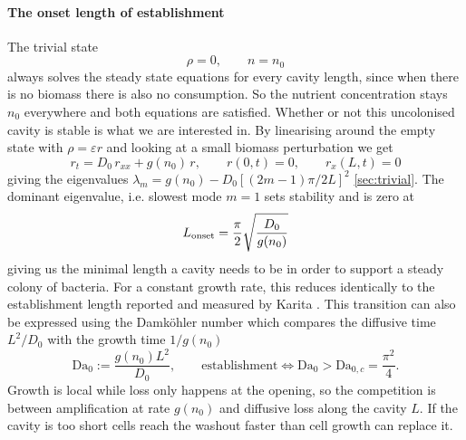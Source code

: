 \documentclass[11pt,a4paper]{report}
\begin{document}
	\paragraph{The onset length of establishment}
	\label{sec:onset}
	The trivial state
	\begin{equation}
		\rho=0,\qquad n= n_0
		\label{eq:trivial_state}
	\end{equation}
	always solves the steady state equations for every cavity length, since when there is no biomass there is also
	no consumption. So the nutrient concentration stays $n_0$ everywhere and both equations are
	satisfied. Whether or not this uncolonised cavity is stable is what we are interested in.
	By linearising around the empty state with $\rho=\varepsilon r$ and looking at a small biomass perturbation we get
	\begin{equation}
		r_t=D_0\,r_{xx}+g(n_0)\,r,
		\qquad r(0,t)=0,
		\qquad r_x(L,t)=0
	\end{equation}
	giving the eigenvalues
	$\lambda_m=g(n_0)-D_0\left[(2m-1)\pi/2L\right]^2$ \ref{sec:trivial}. The dominant eigenvalue, i.e. slowest mode $m=1$ sets stability and is zero at
	\begin{equation}
		{\;L_{\rm onset}=\frac{\pi}{2}\sqrt{\frac{D_0}{g(n_0)}}\;}
		\label{eq:Lonset}
	\end{equation}
	giving us the minimal length a cavity needs to be in order to support a steady colony of bacteria. For a constant growth rate, this reduces identically to the establishment length reported and measured by Karita \cite{Karita}.
	This transition can also be expressed using the Damköhler number which compares the diffusive time $L^2/D_0$ with the growth time $1/g(n_0)$
	\begin{equation}
		\mathrm{Da}_0:=\frac{g(n_0)L^2}{D_0},
		\qquad
		\text{establishment}\iff\mathrm{Da}_0>\mathrm{Da}_{0,c}=\frac{\pi^2}{4}.
	\end{equation}
	Growth is local while loss only happens at the opening, so the competition is
	between amplification at rate $g(n_0)$ and diffusive loss along the cavity $L$.
	If the cavity is too short cells reach the washout faster than cell growth can replace it.
\end{document}

